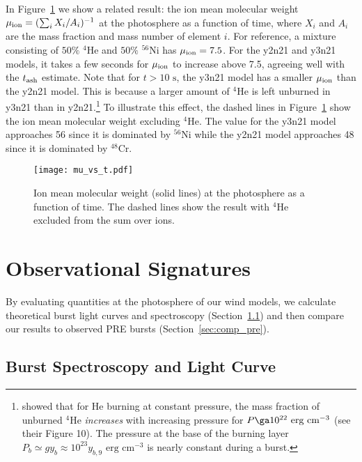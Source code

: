 \documentclass[apj,usenatbib, iop, twocolappendix]{emulateapj}
\newcommand{\trm}[1]{\textrm{#1}}
\begin{document}
In Figure~\ref{fig:mu_vs_t} we show a related result: the ion mean molecular weight $\mu_{\rm ion}=(\sum_{i}X_i/A_i)^{-1}$  at the photosphere as a function of time, where $X_i$ and $A_i$ are the mass fraction and mass number of element $i$. For reference, a mixture consisting of $50\%$ $^4$He and $50\%$ $^{56}$Ni has $\mu_{\rm ion}=7.5$. For the y2n21 and y3n21 models, it takes a few seconds for $\mu_{\rm ion}$ to increase above 7.5, agreeing well with the $t_{\rm ash}$ estimate.  Note that for $t>10\trm{ s}$, the y3n21 model has a smaller $\mu_{\rm ion}$ than the y2n21 model. This is because a larger amount of $^{4}$He is left unburned in y3n21 than in y2n21.\footnote{\citet{Hashimoto:83} showed that for He burning at constant pressure, the mass fraction of unburned $^{4}$He {\it increases} with increasing pressure for $P\ga 10^{22}\trm{ erg cm}^{-3}$ (see their Figure 10). The pressure at the base of the burning layer $P_b\simeq g y_b\approx 10^{23} y_{b,9}\trm{ erg cm}^{-3}$ is nearly constant during a burst.} To illustrate this effect, the dashed lines in Figure~\ref{fig:mu_vs_t} show the ion mean molecular weight excluding $^4$He. The value for the y3n21 model approaches 56 since it is dominated by $^{56}$Ni while the y2n21 model approaches 48 since it is dominated by $^{48}$Cr. 

\begin{figure}
\texttt{[image: mu\_vs\_t.pdf]}
\caption{Ion mean molecular weight (solid lines) at the photosphere as a function of time.  The dashed lines show the result with $^4$He excluded from the sum over ions.}
\label{fig:mu_vs_t}
\end{figure}


\section{Observational Signatures}
\label{sec:observational_signatures}

By evaluating quantities at the photosphere of our wind models, we  calculate theoretical burst light curves and spectroscopy (Section~\ref{sec:spectra_lightcurve}) and then compare our results to observed PRE bursts (Section~\ref{sec:comp_pre}).

\subsection{Burst Spectroscopy and Light Curve}
\label{sec:spectra_lightcurve}
\end{document}
